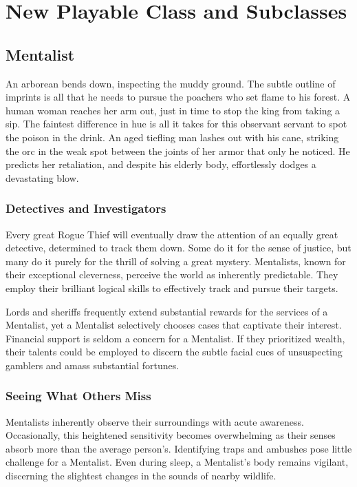 \chapter{New Playable Class and Subclasses}\label{Mentalist}
\section{Mentalist}

An arborean bends down, inspecting the muddy ground. The subtle outline of imprints is all that he needs to pursue the poachers who set flame to his forest. A human woman reaches her arm out, just in time to stop the king from taking a sip. The faintest difference in hue is all it takes for this observant servant to spot the poison in the drink. An aged tiefling man lashes out with his cane, striking the orc in the weak spot between the joints of her armor that only he noticed. He predicts her retaliation, and despite his elderly body, effortlessly dodges a devastating blow.

\subsection{Detectives and Investigators}

Every great Rogue Thief will eventually draw the attention of an equally great detective, determined to track them down. Some do it for the sense of justice, but many do it purely for the thrill of solving a great mystery. Mentalists, known for their exceptional cleverness, perceive the world as inherently predictable. They employ their brilliant logical skills to effectively track and pursue their targets.

Lords and sheriffs frequently extend substantial rewards for the services of a Mentalist, yet a Mentalist selectively chooses cases that captivate their interest. Financial support is seldom a concern for a Mentalist. If they prioritized wealth, their talents could be employed to discern the subtle facial cues of unsuspecting gamblers and amass substantial fortunes.

\subsection{Seeing What Others Miss}

Mentalists inherently observe their surroundings with acute awareness. Occasionally, this heightened sensitivity becomes overwhelming as their senses absorb more than the average person's. Identifying traps and ambushes pose little challenge for a Mentalist. Even during sleep, a Mentalist's body remains vigilant, discerning the slightest changes in the sounds of nearby wildlife.

